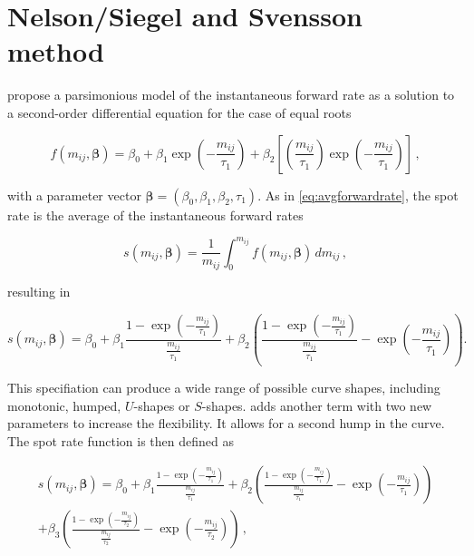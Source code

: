 \section{Nelson/Siegel and Svensson method}
\label{sec:nels-svenss-meth}

\cite{Nelson1987} propose a parsimonious  model of  the instantaneous forward rate as a solution to a second-order differential equation for the case of equal roots

\begin{equation}
  \label{eq:laguerre}
  f(m_{ij},\bm{\beta}) = \beta_0+\beta_1\exp\left(-\frac{m_{ij}}{\tau_1}\right)+\beta_2\left[\left(\frac{m_{ij}}{\tau_1}\right)\exp\left(-\frac{m_{ij}}{\tau_1}\right)\right]\,,
\end{equation}

with a parameter vector ${\bm{\beta}} = \left(\beta_0,\beta_1,\beta_2,\tau_1\right)$. As in \eqref{eq:avgforwardrate}, the spot rate is the average of the instantaneous forward rates

\begin{equation*}
  \label{eq:intspotrate}
  s(m_{ij},\bm{\beta})=\frac{1}{m_{ij}}\int_0^{m_{ij}}f(m_{ij},\bm{\beta})\,dm_{ij}\,,
\end{equation*}

resulting in

\begin{equation}
  \label{eq:nelson-spot}
   s(m_{ij},\bm{\beta}) = \beta_0 + \beta_1\frac{1-\exp(-\frac{m_{ij}}{\tau_1})}{\frac{m_{ij}}{\tau_1}} + \beta_2\left(\frac{1-\exp(-\frac{m_{ij}}{\tau_1})}{\frac{m_{ij}}{\tau_1}} - \exp\left(-\frac{m_{ij}}{\tau_1}\right)\right).
\end{equation}

 
This specifiation can produce a wide range of possible curve shapes, including monotonic, humped, $U$-shapes or $S$-shapes. \cite{Svensson1994} adds another term with two new parameters to increase the flexibility. It allows for a second hump in the curve. The spot rate function is then defined as


\begin{multline}\label{eq:svensson-spot}
    s(m_{ij},\bm{\beta}) = \beta_0 + \beta_1\frac{1-\exp(-\frac{m_{ij}}{\tau_1})}{\frac{m_{ij}}{\tau_1}} + \beta_2\left(\frac{1-\exp(-\frac{m_{ij}}{\tau_1})}{\frac{m_{ij}}{\tau_1}} - \exp\left(-\frac{m_{ij}}{\tau_1}\right)\right) \\+ \beta_3\left(\frac{1-\exp(-\frac{m_{ij}}{\tau_2})}{\frac{m_{ij}}{\tau_2}} - \exp\left(-\frac{m_{ij}}{\tau_2}\right)\right)\,,
\end{multline}



